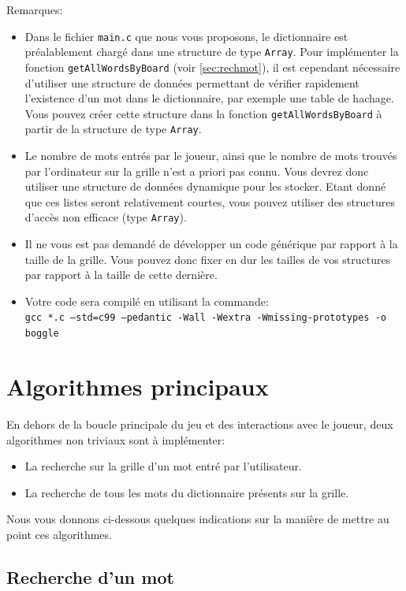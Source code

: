 \documentclass[a4paper,10pt]{article}
\begin{document}
Remarques:
\begin{itemize}
\item Dans le fichier \texttt{main.c} que nous vous proposons, le
  dictionnaire est préalablement chargé dans une structure de type
  \texttt{Array}. Pour implémenter la fonction
  \texttt{getAllWordsByBoard} (voir \ref{sec:rechmot}), il est
  cependant nécessaire d'utiliser une structure de données permettant
  de vérifier rapidement l'existence d'un mot dans le dictionnaire,
  par exemple une table de hachage. Vous pouvez créer cette structure
  dans la fonction \texttt{getAllWordsByBoard} à partir de la
  structure de type \texttt{Array}.
\item Le nombre de mots entrés par le joueur, ainsi que le nombre de
  mots trouvés par l'ordinateur sur la grille n'est a priori pas
  connu. Vous devrez donc utiliser une structure de données dynamique
  pour les stocker. Etant donné que ces listes seront relativement
  courtes, vous pouvez utiliser des structures d'accès non efficace
  (type \texttt{Array}).
\item Il ne vous est pas demandé de développer un code générique par
  rapport à la taille de la grille. Vous pouvez donc fixer en dur les
  tailles de vos structures par rapport à la taille de cette dernière.
\item Votre code sera compilé en utilisant la commande:\\
  \texttt{gcc *.c --std=c99 --pedantic -Wall -Wextra -Wmissing-prototypes -o boggle}
\end{itemize}

\section{Algorithmes principaux}

En dehors de la boucle principale du jeu et des interactions avec
le joueur, deux algorithmes non triviaux sont à implémenter:
\begin{itemize}
\item La recherche sur la grille d'un mot entré par l'utilisateur.
\item La recherche de tous les mots du dictionnaire présents sur la
  grille.
\end{itemize}

Nous vous donnons ci-dessous quelques indications sur la manière de
mettre au point ces algorithmes.

\subsection{Recherche d'un mot}
\end{document}
